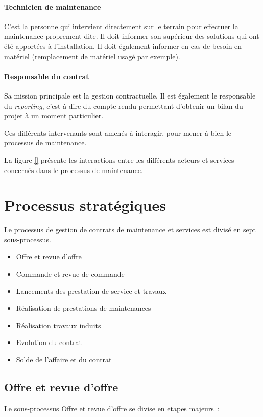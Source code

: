 \paragraph{Technicien de maintenance}{C'est la personne qui intervient directement sur le terrain pour effectuer la maintenance proprement dite. Il doit informer son supérieur des solutions qui ont été apportées à l'installation. Il doit également informer en cas de besoin en matériel (remplacement de matériel usagé par exemple).}
\paragraph{Responsable du contrat}{Sa mission principale est la gestion contractuelle. Il est également le responsable du \textit{reporting}, c'est-à-dire du compte-rendu permettant d'obtenir un bilan du projet à un moment particulier.}

Ces différents intervenants sont amenés à interagir, pour mener à bien le processus de maintenance.

La figure \vref{} présente les interactions entre les différents acteurs et services concernés dans le processus de maintenance.

\section{Processus stratégiques}

Le processus de gestion de contrats de maintenance et services est divis\'e en sept sous-processus.

\begin{itemize}
    \item Offre et revue d'offre
    \item Commande et revue de commande
    \item Lancements des prestation de service et travaux
    \item R\'ealisation de prestations de maintenances
    \item R\'ealisation travaux induits
    \item Evolution du contrat
    \item Solde de l'affaire et du contrat
\end{itemize}

\subsection{Offre et revue d'offre}

Le sous-processus Offre et revue d'offre se divise en etapes majeurs~:

